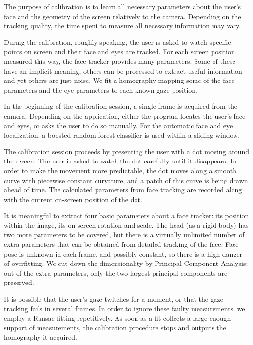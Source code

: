The purpose of calibration is to learn all necessary parameters about the user's face and the geometry of the screen relatively to the camera.
Depending on the tracking quality, the time spent to measure all necessary information may vary.

During the calibration, roughly speaking, the user is asked to watch specific points on screen and their face and eyes are tracked.
For each screen position measured this way, the face tracker provides many parameters.
Some of these have an implicit meaning, others can be processed to extract useful information and yet others are just noise.
We fit a homography mapping some of the face parameters and the eye parameters to each known gaze position.

In the beginning of the calibration session, a single frame is acquired from the camera.
Depending on the application, either the program locates the user's face and eyes, or asks the user to do so manually.
For the automatic face and eye localization, a boosted random forest classifier is used within a sliding window.

The calibration session proceeds by presenting the user with a dot moving around the screen.
The user is asked to watch the dot carefully until it disappears.
In order to make the movement more predictable, the dot moves along a smooth curve with piecewise constant curvature, and a patch of this curve is being drawn ahead of time.
The calculated parameters from face tracking are recorded along with the current on-screen position of the dot.

It is meaningful to extract four basic parameters about a face tracker: its position within the image, its on-screen rotation and scale.
The head (as a rigid body) has two more parameters to be covered, but there is a virtually unlimited number of extra parameters that can be obtained from detailed tracking of the face.
Face pose is unknown in each frame, and possibly constant, so there is a high danger of overfitting.
We cut down the dimensionality by Principal Component Analysis: out of the extra parameters, only the two largest principal components are preserved.

It is possible that the user's gaze twitches for a moment, or that the gaze tracking fails in several frames.
In order to ignore these faulty measurements, we employ a Ransac fitting repetitively.
As soon as a fit collects a large enough support of measurements, the calibration procedure stops and outputs the homography it acquired.

